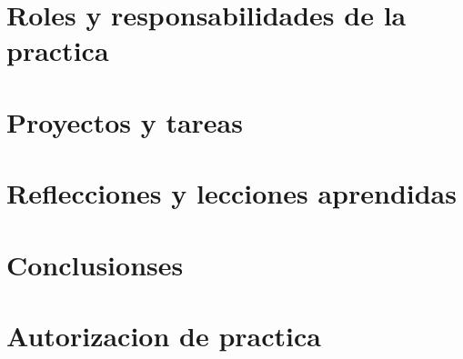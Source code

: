 \documentclass[pdftex,spanish]{pucthesis}	%
\begin{document}
\chapter[ROLES Y RESPONSABILIDADES DE LA PRACTICA]{Roles y responsabilidades de la practica} \label{ch1}


\chapter[PROYECTOS Y TAREAS]{Proyectos y tareas} \label{ch2}


\chapter[REFLECCIONES Y LECCIONES APRENDIDAS]{Reflecciones y lecciones aprendidas} \label{ch3}


\chapter[CONCLUSIONSES]{Conclusionses}





\cleardoublepage
{} \label{references}
\renewcommand{\bibname}{REFERENCIAS}



\printbibliography


\makeatletter
\renewcommand{\appendix}{%
	\setcounter{chapter}{0}%
	\renewcommand\@chapapp{\appendixname}%
	\renewcommand\thechapter{\@Alph\c@chapter}%
}
\makeatother

\appendix
\chapter[Autorizacion de practica]{Autorizacion de practica}

\end{document}
